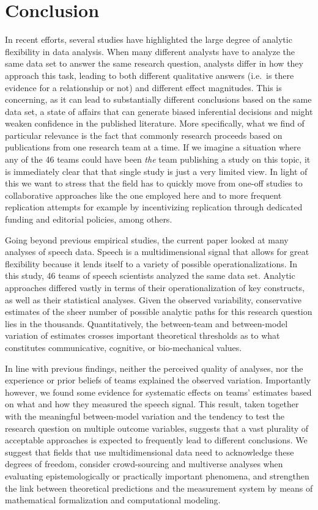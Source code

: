 \documentclass[Review,times,sageh]{sagej}
\begin{document}
\hypertarget{conclusion}{%
\section{Conclusion}\label{conclusion}}

In recent efforts, several studies have highlighted the large degree of analytic flexibility in data analysis.
When many different analysts have to analyze the same data set to answer the same research question, analysts differ in how they approach this task, leading to both different qualitative answers (i.e.~is there evidence for a relationship or not) and different effect magnitudes.
This is concerning, as it can lead to substantially different conclusions based on the same data set, a state of affairs that can generate biased inferential decisions and might weaken confidence in the published literature.
More specifically, what we find of particular relevance is the fact that commonly research proceeds based on publications from one research team at a time.
If we imagine a situation where any of the 46 teams could have been \emph{the} team publishing a study on this topic, it is immediately clear that that single study is just a very limited view.
In light of this we want to stress that the field has to quickly move from one-off studies to collaborative approaches like the one employed here and to more frequent replication attempts for example by incentivizing replication through dedicated funding and editorial policies, among others.

Going beyond previous empirical studies, the current paper looked at many analyses of speech data.
Speech is a multidimensional signal that allows for great flexibility because it lends itself to a variety of possible operationalizations.
In this study, 46 teams of speech scientists analyzed the same data set.
Analytic approaches differed vastly in terms of their operationalization of key constructs, as well as their statistical analyses.
Given the observed variability, conservative estimates of the sheer number of possible analytic paths for this research question lies in the thousands.
Quantitatively, the between-team and between-model variation of estimates crosses important theoretical thresholds as to what constitutes communicative, cognitive, or bio-mechanical values.

In line with previous findings, neither the perceived quality of analyses, nor the experience or prior beliefs of teams explained the observed variation.
Importantly however, we found some evidence for systematic effects on teams' estimates based on what and how they measured the speech signal.
This result, taken together with the meaningful between-model variation and the tendency to test the research question on multiple outcome variables, suggests that a vast plurality of acceptable approaches is expected to frequently lead to different conclusions.
We suggest that fields that use multidimensional data need to acknowledge these degrees of freedom, consider crowd-sourcing and multiverse analyses when evaluating epistemologically or practically important phenomena, and strengthen the link between theoretical predictions and the measurement system by means of mathematical formalization and computational modeling.
\end{document}
